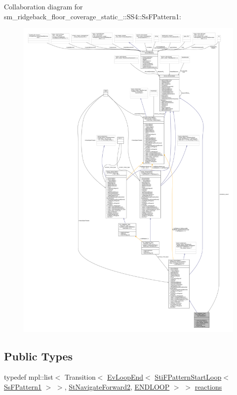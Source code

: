 Collaboration diagram for sm\+\_\+ridgeback\+\_\+floor\+\_\+coverage\+\_\+static\+\_\+:\+:S\+S4\+:\+:Ss\+F\+Pattern1\+:
\nopagebreak
\begin{figure}[H]
\begin{center}
\leavevmode
\includegraphics[width=350pt]{structsm__ridgeback__floor__coverage__static__1_1_1SS4_1_1SsFPattern1__coll__graph}
\end{center}
\end{figure}
\subsection*{Public Types}
\begin{DoxyCompactItemize}
\item 
typedef mpl\+::list$<$ Transition$<$ \hyperlink{structsmacc_1_1default__events_1_1EvLoopEnd}{Ev\+Loop\+End}$<$ \hyperlink{classsm__ridgeback__floor__coverage__static__1_1_1f__pattern__states_1_1StiFPatternStartLoop}{Sti\+F\+Pattern\+Start\+Loop}$<$ \hyperlink{structsm__ridgeback__floor__coverage__static__1_1_1SS4_1_1SsFPattern1}{Ss\+F\+Pattern1} $>$ $>$, \hyperlink{structsm__ridgeback__floor__coverage__static__1_1_1StNavigateForward2}{St\+Navigate\+Forward2}, \hyperlink{structsmacc_1_1default__transition__tags_1_1ENDLOOP}{E\+N\+D\+L\+O\+OP} $>$ $>$ \hyperlink{structsm__ridgeback__floor__coverage__static__1_1_1SS4_1_1SsFPattern1_a5be17507f29e696dced93e8f5f48a351}{reactions}
\end{DoxyCompactItemize}
